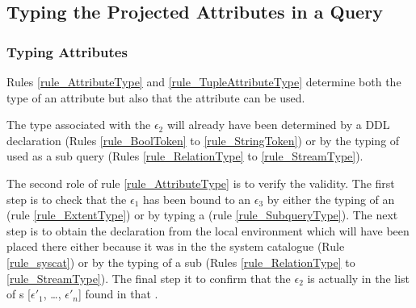 
\subsection{Typing the Projected Attributes in a Query}

\subsubsection{Typing Attributes}
Rules \ref{rule_AttributeType} and \ref{rule_TupleAttributeType} determine both the type of an attribute but also that the attribute can be used.

The type associated with the  $\epsilon_2$ will already have been determined by a DDL declaration 
(Rules \ref{rule_BoolToken} to \ref{rule_StringToken}) or by the typing of  used as a sub query (Rules \ref{rule_RelationType} to \ref{rule_StreamType}).

The second role of rule \ref{rule_AttributeType} is to verify the validity.
The first step is to check that the  $\epsilon_1$ has been bound to an  $\epsilon_3$ by either the typing of an  (rule \ref{rule_ExtentType}) or by typing a  (rule \ref{rule_SubqueryType}).
The next step is to obtain the  declaration from the local environment which will have been placed there either because it was in the the system catalogue (Rule \ref{rule_syscat}) or by the typing of a sub  (Rules \ref{rule_RelationType} to \ref{rule_StreamType}).
The final step it to confirm that the  $\epsilon_2$ is actually in the list of s [$\epsilon'_1$, \mdots, $\epsilon'_n$] found in that .

